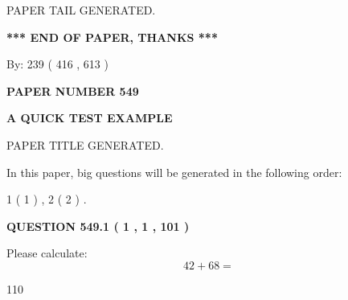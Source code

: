 \documentclass[12pt]{article}
\begin{document}
   
   
   
   
   
 \vspace{0.2in}
 
   
   
\vspace{2.0in} PAPER TAIL GENERATED.
   
   
   
   
\vspace{1.0in} 
{\textbf{\large{ *** END OF PAPER, THANKS *** }}} 
   
   
\hspace{1.0in} By: 
 239 ( 416 ,  613 )
   
   
   
   
\newpage 
\setcounter{page}{ 
   549001 } 
   
   
   
   
 {\textbf{ \Large{ PAPER NUMBER  549  }}}
   
   
\vspace{0.2in}
   
   
   
   
   
   
   
   
 \vspace{0.2in}
{\LARGE {\textbf{ A QUICK TEST EXAMPLE}}}
   
   
 PAPER TITLE GENERATED.
   
   
   
\vspace{0.2in}
   
In this paper, big questions will be generated in the following order: 
   
   
   1 ( 1 )
 ,
   2 ( 2 )
 .
  
\vspace{0.2in}
  
{\textbf{\Large{QUESTION
549.1 
 ( 1 , 1 , 101 )
}}}
  
  
 
Please calculate:
\begin{equation}
42 +  %
68 = \nonumber
\end{equation}
 
 
 
\noindent{}
 
 

110
 
\end{document}

